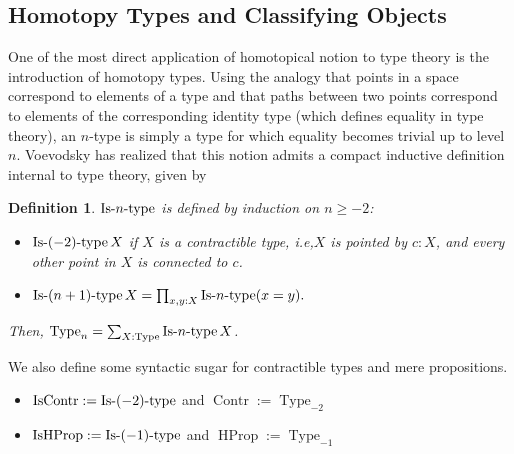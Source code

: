 \documentclass[conference]{IEEEtran}
\newtheorem{defi}[thm]{Definition}
\newcommand{\ie}{i.e,\xspace}
\DeclareMathOperator{\Type}{Type}
\DeclareMathOperator{\HProp}{HProp}
\DeclareMathOperator{\IsHProp}{IsHProp}
\DeclareMathOperator{\Contr}{Contr}
\DeclareMathOperator{\IsContr}{IsContr}
\def\mymathhyphen{{\hbox{-}}}
\newcommand{\IsType}[1]
{\mathop{\mathrm{Is\mymathhyphen}#1\mathrm{\mymathhyphen type}} }
\begin{document}
 \subsection{Homotopy Types and Classifying Objects}
\label{ssec:hott}

One of the most direct application of homotopical notion to type
theory is the introduction of homotopy types. 
%
Using the analogy that points in a space correspond to elements of a
type and that paths between two points correspond to 
elements of the corresponding identity type (which defines equality in type theory),  
%
an $n$-type is simply a type
for which equality becomes trivial up to level $n$. 
%
Voevodsky has realized that this notion admits a compact inductive definition
internal to type theory, given by
\begin{defi}
  $\IsType n$ is defined by induction on $n\geqslant -2$:
  \begin{itemize}
  \item $\IsType {(-2)} X$ if $X$ is a contractible type, \ie $X$
    is pointed by $c:X$, and every other point in $X$ is connected to $c$.
  \item $\IsType {(n+1)} X = \prod_{x,y:X} \IsType n (x=y).$
  \end{itemize}
  Then, $\Type_n = \sum_{X:\Type} \IsType n X$.
\end{defi}
%
We also define some syntactic sugar for contractible types and mere propositions.

\begin{itemize}
\item $\IsContr := \IsType {(-2)}$ and $\Contr := \Type_{-2}$
\item $\IsHProp := \IsType {(-1)}$ and $\HProp := \Type_{-1}$
\end{itemize}
\end{document}
